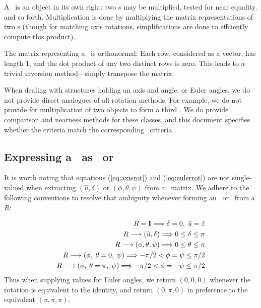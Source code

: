 A \Ro\ is an object in its own right; two \Ro s may be multiplied,
tested for near equality, and so forth.
Multiplication is done by multiplying the matrix representations of two
\Ro s (though for matching axis rotations, simplifications are
done to effciently compute this product).

The matrix representing a \Ro\ is orthonormal:  Each row, considered
as a vector, has length 1, and the dot product of any two distinct rows
is zero.  This leads to a trivial inversion method---simply transpose the
matrix.

When dealing with structures holding an axis and angle, or Euler angles,
we do not provide direct analogues of all rotation methods.  For example,
we do not provide for multiplication of two \Ax objects to form a third
\Ax.  We do provide comparison and nearness methods for these classes,
and this document specifies whether the criteria match the corresponding
\Rotation\ criteria.

\subsection{Expressing a \protect\Ro\ as \protect\Ax\ or \protect\Es\ }

It is worth noting that equations (\ref{eq:axisrot}) and (\ref{eq:eulerrot})
are not single-valued when extracting $ ( \hat{u}, \delta) $ or
$ ( \phi, \theta, \psi ) $ from a \Rotation\ matrix.  We adhere to the
following conventions to resolve that ambiguity whenever forming an
\Ax\ or \Es\ from a \Rotation $R$:

\begin{eqnarray}
  R = {\bf I} \Longrightarrow \delta = 0, \; \hat{u} = \hat{z}
	\\
  R \longrightarrow ( \hat{u}, \delta ) \Longrightarrow 0 \leq \delta \leq \pi
	\\
	\label{eq:deltaconv}
  R \longrightarrow ( \phi, \theta, \psi )
	\Longrightarrow 0 \leq \theta \leq \pi
	\label{eq:thetaconv}
	\\
  R \longrightarrow ( \phi, \; \theta = 0, \; \psi )
	\Longrightarrow -\pi/2 < \phi = \psi \leq \pi/2
	\label{eq:phipsiconv}
	\\
  R \longrightarrow ( \phi, \; \theta = \pi, \; \psi )
	\Longrightarrow -\pi/2 < \phi = -\psi \leq \pi/2
\end{eqnarray}
\noindent
Thus when supplying values for Euler angles,
we return $(0, 0, 0)$ whenever the rotation is
equivalent to the identity, and return $(0, \pi, 0)$ in preference to
the equivalent $(\pi, \pi, \pi)$.

